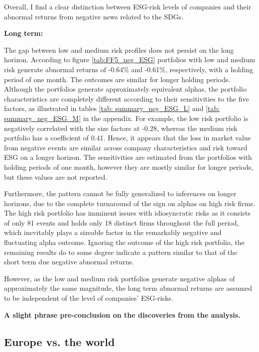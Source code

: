 Overall, I find a clear distinction between ESG-risk levels of companies and their abnormal returns from negative news related to the SDGs. 

\textbf{Long term:}

The gap between low and medium risk profiles does not persist on the long horizon. According to figure \ref{tab:FF5_neg_ESG} portfolios with low and medium risk generate abnormal returns of -0.64\% and -0.61\%, respectively, with a holding period of one month. The outcomes are similar for longer holding periods. 
Although the portfolios generate approximately equivalent alphas, the portfolio characteristics are completely different according to their sensitivities to the five factors, as illustrated in tables \ref{tab: summary_neg_ESG_L} and \ref{tab: summary_neg_ESG_M} in the appendix. For example, the low risk portfolio is negatively correlated with the size factors at -0.28, whereas the medium risk portfolio has a coefficient of 0.41. Hence, it appears that the loss in market value from negative events are similar across company characteristics and risk toward ESG on a longer horizon. The sensitivities are estimated from the portfolios with holding periods of one month, however they are mostly similar for longer periods, but these values are not reported. 

Furthermore, the pattern cannot be fully generalized to inferences on longer horizons, due to the complete turnaround of the sign on alphas on high risk firms. The high risk portfolio has imminent issues with idiosyncratic risks as it consists of only 81 events and holds only 18 distinct firms throughout the full period, which inevitably plays a sizeable factor in the remarkably negative and fluctuating alpha outcome. Ignoring the outcome of the high risk portfolio, the remaining results do to some degree indicate a pattern similar to that of the short term due negative abnormal returns.

However, as the low and medium risk portfolios generate negative alphas of approximately the same magnitude, the long term abnormal returns are assumed to be independent of the level of companies' ESG-risks. 


\textbf{A slight phrase pre-conclusion on the discoveries from the analysis.}

\subsection{Europe vs. the world}

